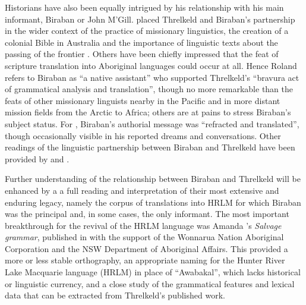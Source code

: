 Historians have also been equally intrigued by his relationship with his main informant, Biraban or John M’Gill. \citet{carey_lancelot_2004} placed Threlkeld and Biraban’s partnership in the wider context of the practice of missionary linguistics, the creation of a colonial Bible in Australia \citep{carey_lancelot_2010} and the importance of linguistic texts about the passing of the frontier \citep{carey_death_2009}. Others have been chiefly impressed that the feat of scripture translation into Aboriginal languages could occur at all. Hence Roland \citet[151--152]{boer_last_2008} refers to Biraban as “a native assistant” who supported Threlkeld’s “bravura act of grammatical analysis and translation”, though no more remarkable than the feats of other missionary linguists nearby in the Pacific and in more distant mission fields from the Arctic to Africa; others are at pains to stress Biraban’s subject status. For \citet[46]{van_toorn_writing_2006}, Biraban’s authorial message was “refracted and translated”, though occasionally visible in his reported dreams and conversations. Other readings of the linguistic partnership between Biraban and Threlkeld have been provided by \citet{roberts_language_2008} and \citet{keary_christianity_2009}.

Further understanding of the relationship between Biraban and Threlkeld will be enhanced by a a full reading and interpretation of their most extensive and enduring legacy, namely the corpus of translations into HRLM for which Biraban was the principal and, in some cases, the only informant. The most important breakthrough for the revival of the HRLM language was Amanda \citeauthor{lissarrague_salvage_2006}’s \textit{Salvage grammar}, published in \citeyear{lissarrague_salvage_2006} with the support of the Wonnarua Nation Aboriginal Corporation and the NSW Department of Aboriginal Affairs. This provided a more or less stable orthography, an appropriate naming for the Hunter River Lake Macquarie language (HRLM) in place of “Awabakal”, which lacks historical or linguistic currency, and a close study of the grammatical features and lexical data that can be extracted from Threlkeld’s published work.

